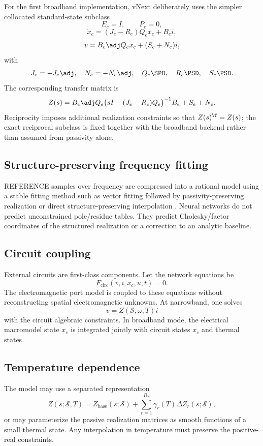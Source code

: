 For the first broadband implementation, vNext deliberately uses the simpler
collocated standard-state subclass
\[
 E_e=I,\qquad P_e=0,
\]
\[
 \dot x_e=(J_e-R_e)Q_e x_e+B_e i,
\]
\[
 v=B_e\adj Q_e x_e+(S_e+N_e)i,
\]
with
\[
 J_e=-J_e\adj,\quad N_e=-N_e\adj,\quad
 Q_e\SPD,\quad R_e\PSD,\quad S_e\PSD.
\]
The corresponding transfer matrix is
\[
 Z(s)
 =
 B_e\adj Q_e
 \big(sI-(J_e-R_e)Q_e\big)^{-1}B_e
 +S_e+N_e.
\]
Reciprocity imposes additional realization constraints so that
$Z(s)^\T=Z(s)$; the exact reciprocal subclass is fixed together with the
broadband backend rather than assumed from passivity alone.

\subsection{Structure-preserving frequency fitting}

REFERENCE samples over frequency are compressed into a rational model using a
stable fitting method such as vector fitting followed by passivity-preserving
realization or direct structure-preserving interpolation
\cite{gustavsen1999vector,benner2015mor}. Neural networks do not predict
unconstrained pole/residue tables. They predict Cholesky/factor coordinates of
the structured realization or a correction to an analytic baseline.

\subsection{Circuit coupling}

External circuits are first-class components. Let the network equations be
\[
  F_{\mathrm{circ}}(v,i,x_c,u,t)=0.
\]
The electromagnetic port model is coupled to these equations without
reconstructing spatial electromagnetic unknowns. At narrowband, one solves
\[
  v=Z(\mathcal S,\omega,T)i
\]
with the circuit algebraic constraints. In broadband mode, the electrical
macromodel state $x_e$ is integrated jointly with circuit states $x_c$ and
thermal states.

\subsection{Temperature dependence}

The model may use a separated representation
\[
 Z(s;\mathcal S,T)
 =
 Z_{\mathrm{base}}(s;\mathcal S)
 +\sum_{r=1}^{R_T}\gamma_r(T)\Delta Z_r(s;\mathcal S),
\]
or may parameterize the passive realization matrices as smooth functions of a
small thermal state. Any interpolation in temperature must preserve the
positive-real constraints.
